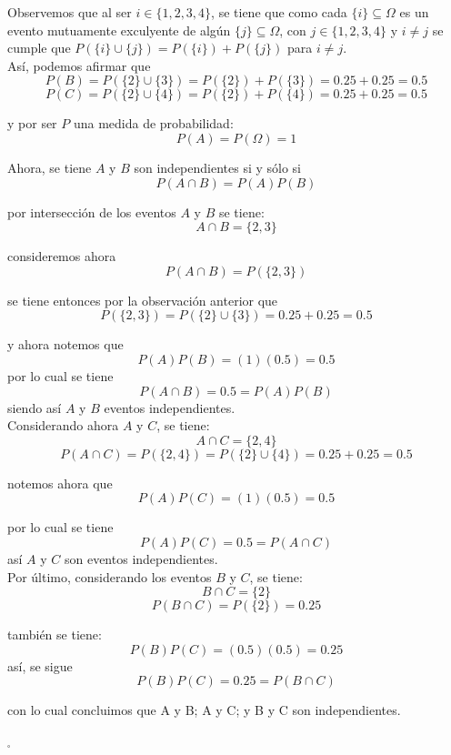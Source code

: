 \documentclass[12pt,a4paper]{report}
\begin{document}
\begin{enumerate}
{		Observemos que al ser $i \in \{1,2,3,4\}$, se tiene que como cada $ \{i\} \subseteq \Omega$
		es un evento mutuamente exculyente de algún $\{ j \} \subseteq \Omega$, con
		$j \in \{1,2,3,4\}$ y $ i \neq j$ se cumple que $ P(\{i\} \cup \{j\}) = P(\{i\}) + P(\{j\}) $
		para $i \neq j$.\\

		Así, podemos afirmar que
			$$ P(B) = P(\{ 2 \} \cup \{ 3 \} ) = P(\{2\}) + P(\{3\}) = 0.25 + 0.25 = 0.5 $$
			$$ P(C) = P(\{ 2 \} \cup \{ 4 \} ) = P(\{2\}) + P(\{4\}) = 0.25 + 0.25 = 0.5 $$

		y por ser $P$ una medida de probabilidad:
			$$ P(A) = P(\Omega) = 1 $$

		Ahora, se tiene $A$ y $B$ son independientes si y sólo si
			$$ P(A \cap B) = P(A)P(B) $$

		por intersección de los eventos $A$ y $B$ se tiene:
			$$ A \cap B = \{ 2,3 \}$$

		consideremos ahora
			$$ P( A \cap B ) = P(\{ 2,3 \})$$

		se tiene entonces por la observación anterior que
			$$ P(\{ 2,3 \}) = P(\{ 2 \} \cup \{ 3 \} ) = 0.25 + 0.25 = 0.5$$

		y ahora notemos que
			$$ P(A)P(B) = (1)(0.5) = 0.5 $$
		por lo cual se tiene
			$$ P(A \cap B) = 0.5 = P(A)P(B) $$
		siendo así $A$ y $B$ eventos independientes.\\

		Considerando ahora $A$ y $C$, se tiene:
			$$ A \cap C = \{ 2,4 \}$$
			$$ P( A \cap C ) = P(\{ 2,4 \}) = P(\{ 2 \} \cup \{ 4 \} ) = 0.25 + 0.25 = 0.5 $$

		notemos ahora que
			$$ P(A)P(C) = (1)(0.5) = 0.5 $$

		por lo cual se tiene
			$$ P(A)P(C) = 0.5 = P( A \cap C ) $$
		así $A$ y $C$ son eventos independientes.\\

		Por último, considerando los eventos $B$ y $C$, se tiene:
			$$ B \cap C = \{ 2 \}$$
			$$ P( B \cap C ) = P(\{ 2 \}) = 0.25 $$

		también se tiene:
			$$ P(B)P(C) = (0.5)(0.5) = 0.25 $$
		así, se sigue
			$$ P(B)P(C) = 0.25 =  P( B \cap C )$$

		con lo cual concluimos que A y B; A y C; y B y C son independientes.
		\begin{flushright}
			$_{\square}$
		\end{flushright}
	}


\end{enumerate}
\end{document}
